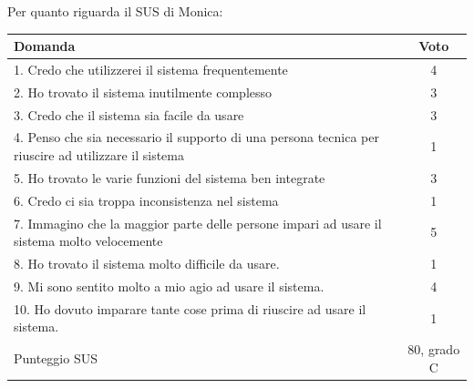 \documentclass[../Report.tex]{subfiles}
\begin{document}
    Per quanto riguarda il SUS di Monica:
    \begin{table}[H]
        \begin{tabular}{|p{10cm}|c|}
            \hline
            \textbf{Domanda} & \textbf{Voto}\\
            \hline
            1. \cellcolor{green} Credo che utilizzerei il sistema frequentemente & 4 \\
            \hline
            2. \cellcolor{red} Ho trovato il sistema inutilmente complesso & 3  \\
            \hline
            3. \cellcolor{green} Credo che il sistema sia facile da usare & 3 \\
            \hline
            4. \cellcolor{red} Penso che sia necessario il supporto di una persona tecnica per riuscire ad utilizzare il sistema & 1 \\
            \hline
            5. \cellcolor{green} Ho trovato le varie funzioni del sistema ben integrate & 3 \\
            \hline
            6. \cellcolor{red} Credo ci sia troppa inconsistenza nel sistema & 1 \\
            \hline
            7. \cellcolor{green} Immagino che la maggior parte delle persone impari ad usare il sistema molto velocemente & 5 \\
            \hline
            8. \cellcolor{red} Ho trovato il sistema molto difficile da usare. & 1 \\
            \hline
            9. \cellcolor{green} Mi sono sentito molto a mio agio ad usare il sistema. & 4 \\
            \hline
            10. \cellcolor{red} Ho dovuto imparare tante cose prima di riuscire ad usare il sistema. & 1 \\ 
            \hline
            Punteggio SUS & 80, grado C \\
            \hline
        \end{tabular}
    \end{table}    
\end{document}
